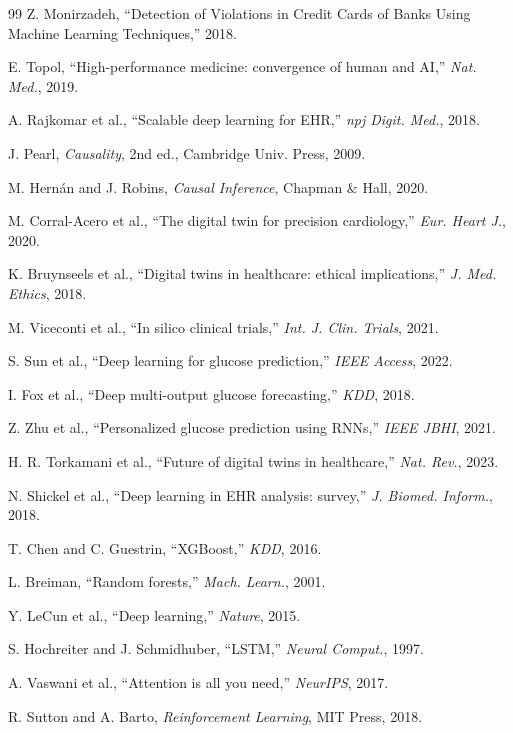 \documentclass[journal]{IEEEtran}
\begin{document}
\begin{thebibliography}{99}
Z. Monirzadeh, “Detection of Violations in Credit Cards of Banks Using Machine Learning Techniques,” 2018.

E. Topol, “High-performance medicine: convergence of human and AI,” \textit{Nat. Med.}, 2019.

A. Rajkomar et al., “Scalable deep learning for EHR,” \textit{npj Digit. Med.}, 2018.

J. Pearl, \textit{Causality}, 2nd ed., Cambridge Univ. Press, 2009.

M. Hernán and J. Robins, \textit{Causal Inference}, Chapman \& Hall, 2020.

M. Corral-Acero et al., “The digital twin for precision cardiology,” \textit{Eur. Heart J.}, 2020.

K. Bruynseels et al., “Digital twins in healthcare: ethical implications,” \textit{J. Med. Ethics}, 2018.

M. Viceconti et al., “In silico clinical trials,” \textit{Int. J. Clin. Trials}, 2021.

S. Sun et al., “Deep learning for glucose prediction,” \textit{IEEE Access}, 2022.

I. Fox et al., “Deep multi-output glucose forecasting,” \textit{KDD}, 2018.

Z. Zhu et al., “Personalized glucose prediction using RNNs,” \textit{IEEE JBHI}, 2021.

H. R. Torkamani et al., “Future of digital twins in healthcare,” \textit{Nat. Rev.}, 2023.

N. Shickel et al., “Deep learning in EHR analysis: survey,” \textit{J. Biomed. Inform.}, 2018.

T. Chen and C. Guestrin, “XGBoost,” \textit{KDD}, 2016.

L. Breiman, “Random forests,” \textit{Mach. Learn.}, 2001.

Y. LeCun et al., “Deep learning,” \textit{Nature}, 2015.

S. Hochreiter and J. Schmidhuber, “LSTM,” \textit{Neural Comput.}, 1997.

A. Vaswani et al., “Attention is all you need,” \textit{NeurIPS}, 2017.

R. Sutton and A. Barto, \textit{Reinforcement Learning}, MIT Press, 2018.


\end{thebibliography}
\end{document}
